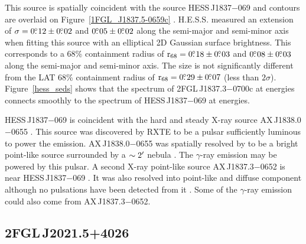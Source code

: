 \documentclass[12pt,preprint]{aastex}
\newcommand{\gev}{\text{GeV}\xspace}
\newcommand{\tev}{\text{TeV}\xspace}
\newcommand{\chandra}{\text{{\em Chandra}}\xspace}
\newcommand{\rsixeight}{{\ensuremath{\text{r}_{68}}}\xspace}
\begin{document}
This source is spatially coincident with the \tev source HESS\,J1837$-$069
and \tev contours are overlaid on 
Figure~\ref{1FGL_J1837.5-0659c} \citep{hess_plane_survey}.  
H.E.S.S. measured
an extension of $\sigma=0\mbox{$.\!\!^\circ$}12\pm0\mbox{$.\!\!^\circ$}02$ and $0\mbox{$.\!\!^\circ$}05\pm0\mbox{$.\!\!^\circ$}02$
along the semi-major and semi-minor axis when fitting this source
with an elliptical 2D Gaussian surface brightness.  This corresponds
to a 68\% containment radius of $\rsixeight=0\fdg18\pm0\fdg03$ and
$0\mbox{$.\!\!^\circ$}08\pm0\mbox{$.\!\!^\circ$}03$ along the semi-major and semi-minor axis. The
size is not significantly different from the LAT 68\% containment radius of
$\rsixeight=0\fdg29\pm0\fdg07$ (less than $2\sigma$).  
Figure~\ref{hess_seds} shows that the spectrum
of 2FGL\,J1837.3$-$0700c at \gev energies
connects smoothly to the spectrum of HESS\,J1837$-$069
at \tev energies.

HESS\,J1837$-$069 is coincident
with the hard and steady X-ray source AX\,J1838.0$-$0655
\citep{einstein_galactic_plane_survey,hard_x-ray_asca,integral_AX_J1838.0-0655,swift_follow_up,pulsations_HESS_J1837-069,suzaku_HESS_J1837-069}.
This source was discovered by RXTE to be a pulsar sufficiently
luminous to power the \tev emission.  AX\,J1838.0$-$0655 was spatially
resolved by \chandra to be a bright point-like source surrounded by
a $\sim2\mbox{$^\prime$}$ nebula \citep{pulsations_HESS_J1837-069}. The
$\gamma$-ray emission may be powered by this pulsar.  A second X-ray
point-like source AX\,J1837.3$-$0652 is near HESS\,J1837$-$069
\citep{hard_x-ray_asca,swift_follow_up,pulsations_HESS_J1837-069,suzaku_HESS_J1837-069}.
It was also resolved into point-like and diffuse component
although no pulsations have been detected from it
\citep{pulsations_HESS_J1837-069}. Some of the $\gamma$-ray emission
could also come from AX\,J1837.3$-$0652.


\subsection{2FGL\,J2021.5+4026}
\label{section_2FGL J2021.5+4026}


\end{document}
